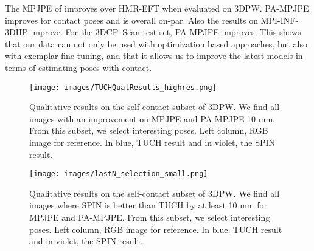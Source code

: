 \documentclass[final]{cvpr}
\newcommand{\threedcpscan}{\mbox{3DCP Scan}\xspace}
\theoremstyle{definition}
\begin{document}
The MPJPE of 
improves over HMR-EFT when evaluated on 3DPW. PA-MPJPE improves for
contact poses and is overall on-par. Also the results on MPI-INF-3DHP
improve. For the \threedcpscan test set, PA-MPJPE improves. This shows that our 
data can not only be used with optimization based approaches, but also 
with exemplar fine-tuning, and that it allows us to improve the latest models in terms of estimating poses with contact. 	\begin{figure*}[h]
	\begin{center}
		\texttt{[image: images/TUCHQualResults\_highres.png]}
	\end{center}
	\caption{Qualitative results on the self-contact subset of 3DPW. We find all images with an improvement on MPJPE and PA-MPJPE  10 mm. From this subset, we select interesting poses. Left column, RGB image for reference. In blue, TUCH result and in violet, the SPIN result.}
	\label{fig:qual_result_tuch}
\end{figure*}

\begin{figure*}[h]
	\begin{center}
		\texttt{[image: images/lastN\_selection\_small.png]}
	\end{center}
	\caption{Qualitative results on the self-contact subset of 3DPW. We find all images where SPIN is better than TUCH by at least 10 mm for MPJPE and PA-MPJPE. From this subset, we select interesting poses. Left column, RGB image for reference. In blue, TUCH result and in violet, the SPIN result.}
	\label{fig:qual_result_tuch2}
\end{figure*}
 
\end{document}
